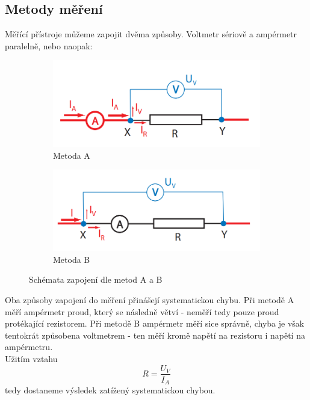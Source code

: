 \documentclass[czech,11pt,a4paper]{article}
\begin{document}
	\subsection{Metody měření}
	Měřící přístroje můžeme zapojit dvěma způsoby. Voltmetr sériově a ampérmetr paralelně, nebo naopak:

   
   \begin{figure}[H]
   	
   	\begin{subfigure}{0.5\textwidth}
   		\includegraphics[width=0.9\linewidth, ]{MetodaA} 
   		\caption{Metoda A}
   		\label{fig:subim1}
   	\end{subfigure}
   	\begin{subfigure}{0.5\textwidth}
   		\includegraphics[width=0.9\linewidth, ]{MetodaB}
   		\caption{Metoda B}
   		\label{fig:subim2}
   	\end{subfigure}
   	
   	\caption{Schémata zapojení dle metod A a B}
   	\label{fig:image2} \end{figure}
   	
   	
   	
   	
   Oba způsoby zapojení do měření přinášejí systematickou chybu. Při metodě A měří ampérmetr proud, který se následně větví - neměří tedy pouze proud protékající rezistorem. Při metodě B ampérmetr měří sice správně, chyba je však tentokrát způsobena voltmetrem - ten měří kromě napětí na rezistoru i napětí na ampérmetru. \\
   Užitím vztahu \begin{equation}
   	R = \frac{U_V}{I_A}
   \end{equation}
   tedy dostaneme výsledek zatížený systematickou chybou.
   
\end{document}
